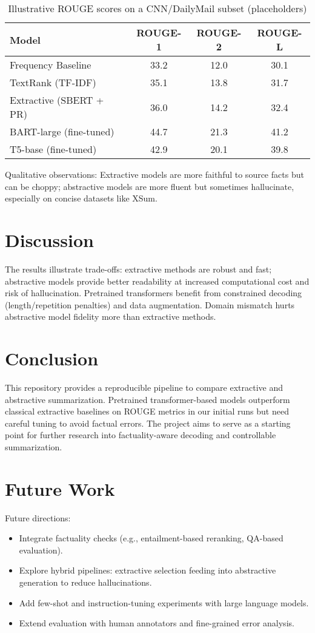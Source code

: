\documentclass[11pt,a4paper]{article}
\begin{document}
\begin{table}[H]
\centering
\caption{Illustrative ROUGE scores on a CNN/DailyMail subset (placeholders)}
\label{tab:results}
\begin{tabular}{lccc}
\toprule
Model & ROUGE-1 & ROUGE-2 & ROUGE-L \\
\midrule
Frequency Baseline      & 33.2 & 12.0 & 30.1 \\
TextRank (TF-IDF)       & 35.1 & 13.8 & 31.7 \\
Extractive (SBERT + PR) & 36.0 & 14.2 & 32.4 \\
BART-large (fine-tuned) & 44.7 & 21.3 & 41.2 \\
T5-base (fine-tuned)    & 42.9 & 20.1 & 39.8 \\
\bottomrule
\end{tabular}
\end{table}

Qualitative observations:
Extractive models are more faithful to source facts but can be choppy; abstractive models are more fluent but sometimes hallucinate, especially on concise datasets like XSum.

\section{Discussion}
The results illustrate trade-offs: extractive methods are robust and fast; abstractive models provide better readability at increased computational cost and risk of hallucination. Pretrained transformers benefit from constrained decoding (length/repetition penalties) and data augmentation. Domain mismatch hurts abstractive model fidelity more than extractive methods.

\section{Conclusion}
This repository provides a reproducible pipeline to compare extractive and abstractive summarization. Pretrained transformer-based models outperform classical extractive baselines on ROUGE metrics in our initial runs but need careful tuning to avoid factual errors. The project aims to serve as a starting point for further research into factuality-aware decoding and controllable summarization.

\section{Future Work}
Future directions:
\begin{itemize}
    \item Integrate factuality checks (e.g., entailment-based reranking, QA-based evaluation).
    \item Explore hybrid pipelines: extractive selection feeding into abstractive generation to reduce hallucinations.
    \item Add few-shot and instruction-tuning experiments with large language models.
    \item Extend evaluation with human annotators and fine-grained error analysis.
\end{itemize}
\end{document}
